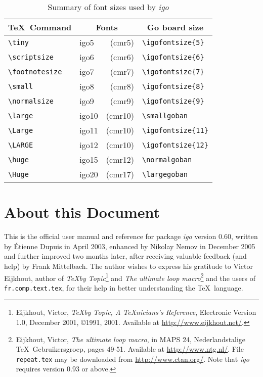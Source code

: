 \documentclass[fleqn]{article}
\begin{document}
\begin{table}[htb] 
	\caption{Summary of font sizes used by \textit{igo}}
	\label{tab:fonts}
	\begin{center}
		\begin{tabular}{llrl}
			\hline
			\multicolumn{1}{c}{\TeX\ Command} & \multicolumn{2}{c}{Fonts} & \multicolumn{1}{c}{Go board size} \\
			\hline \hline
			\verb|\tiny|         & igo5  &  (cmr5) & \verb|\igofontsize{5}|  \\
			\verb|\scriptsize|   & igo6  &  (cmr6) & \verb|\igofontsize{6}|  \\
			\verb|\footnotesize| & igo7  &  (cmr7) & \verb|\igofontsize{7}|  \\
			\verb|\small|        & igo8  &  (cmr8) & \verb|\igofontsize{8}|  \\
			\verb|\normalsize|   & igo9  &  (cmr9) & \verb|\igofontsize{9}|  \\
			\verb|\large|        & igo10 & (cmr10) & \verb|\smallgoban| \\
			\verb|\Large|        & igo11 & (cmr10) & \verb|\igofontsize{11}| \\
			\verb|\LARGE|        & igo12 & (cmr10) & \verb|\igofontsize{12}| \\
			\verb|\huge|         & igo15 & (cmr12) & \verb|\normalgoban|     \\
			\verb|\Huge|         & igo20 & (cmr17) & \verb|\largegoban|      \\
			\hline \hline 
		\end{tabular}
	\end{center}
\end{table}

\section{About this Document}

This is the official user manual and reference for package \textit{igo} version 0.60, written by {\'E}tienne Dupuis in April 2003, enhanced by Nikolay Nemov in December 2005 and further improved two months later, after receiving valuable feedback (and help) by Frank Mittelbach. The author wishes to express his gratitude to Victor Eijkhout, author of \textit{\TeX by Topic}\footnote{Eijkhout, Victor, \textit{\TeX by Topic, A \TeX nicians's Reference}, Electronic Version 1.0, December 2001, \copyright 1991, 2001. Available at \url{http://www.eijkhout.net/}.} and \textit{The ultimate loop macro}\footnote{Eijkhout, Victor, \textit{The ultimate loop macro}, in MAPS 24, Nederlandstalige \TeX\ Gebruikersgroep, pages 49-51. Available at \url{http://www.ntg.nl/}. File \texttt{repeat.tex} may be downloaded from \url{http://www.ctan.org/}. Note that \textit{igo} requires version 0.93 or above.} and the users of \verb|fr.comp.text.tex|, for their help in better understanding the \TeX\ language.
\end{document}
